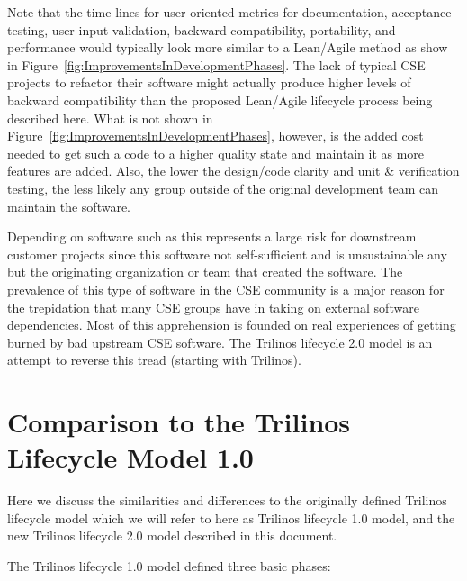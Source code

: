\documentclass[11pt]{SANDreport}
\begin{document}
Note that the time-lines for user-oriented metrics for documentation,
acceptance testing, user input validation, backward compatibility,
portability, and performance would typically look more similar to a
Lean/Agile method as show in
Figure~\ref{fig:ImprovementsInDevelopmentPhases}.  The lack of typical
CSE projects to refactor their software might actually produce higher
levels of backward compatibility than the proposed Lean/Agile
lifecycle process being described here.  What is not shown in
Figure~\ref{fig:ImprovementsInDevelopmentPhases}, however, is the
added cost needed to get such a code to a higher quality state and
maintain it as more features are added.  Also, the lower the
design/code clarity and unit \& verification testing, the less likely
any group outside of the original development team can maintain the
software.

Depending on software such as this represents a large risk for
downstream customer projects since this software not self-sufficient
and is unsustainable any but the originating organization or team that
created the software.  The prevalence of this type of software in the
CSE community is a major reason for the trepidation that many CSE
groups have in taking on external software dependencies.  Most of this
apprehension is founded on real experiences of getting burned by bad
upstream CSE software.  The Trilinos lifecycle 2.0 model is an attempt
to reverse this tread (starting with Trilinos).


%
\section{Comparison to the Trilinos Lifecycle Model 1.0}
\label{sec:compare_with_lifecycle_1.0_model}
%

Here we discuss the similarities and differences to the originally
defined Trilinos lifecycle model {}\cite{TrilinosLifecycleModel2007}
which we will refer to here as Trilinos lifecycle 1.0 model, and the
new Trilinos lifecycle 2.0 model described in this document.

The Trilinos lifecycle 1.0 model defined three basic phases:
\end{document}
